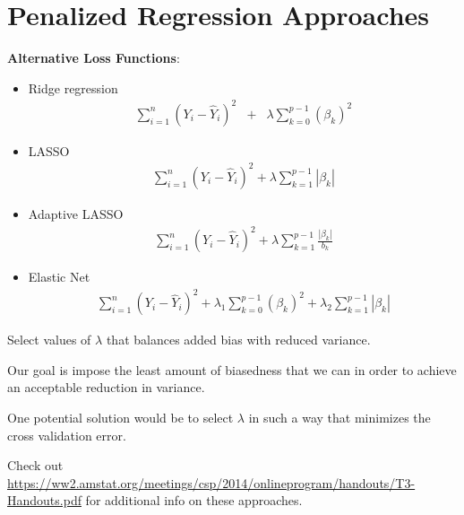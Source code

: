 \documentclass[12pt]{notes}
\begin{document}
\section{Penalized Regression Approaches}
\textbf{Alternative Loss Functions}:
\begin{itemize}
  \item Ridge regression
  \begin{eqnarray}
      \sum_{i=1}^{n} \left( Y_i - \hat{Y}_i \right)^2 & + & \lambda \sum_{k=0}^{p-1} \left(\beta_k \right)^2 \nonumber
  \end{eqnarray}
  \item LASSO
  \begin{eqnarray}
    \sum_{i=1}^{n} \left( Y_i - \hat{Y}_i \right)^2 + \lambda \sum_{k=1}^{p-1} |\beta_k| \nonumber
  \end{eqnarray}
  \item Adaptive LASSO
  \begin{eqnarray}
    \sum_{i=1}^{n} \left( Y_i - \hat{Y}_i \right)^2 + \lambda \sum_{k=1}^{p-1} \frac{|\beta_k|}{b_k} \nonumber
  \end{eqnarray}
   \item Elastic Net
  \begin{eqnarray}
    \sum_{i=1}^{n} \left( Y_i - \hat{Y}_i \right)^2 + \lambda_1 \sum_{k=0}^{p-1} \left(\beta_k \right)^2 + \lambda_2 \sum_{k=1}^{p-1} |\beta_k| \nonumber
  \end{eqnarray}
\end{itemize}

\nspace
\bi
\item Select values of $\lambda$ that balances added bias with reduced variance. 
\item Our goal is impose the least amount of biasedness that we can in order to achieve an acceptable reduction in variance. 
\item One potential solution would be to select $\lambda$ in such a way that minimizes the cross validation error. 
\ei

\nspace
Check out \url{https://ww2.amstat.org/meetings/csp/2014/onlineprogram/handouts/T3-Handouts.pdf} for additional info on these approaches. 


 \begin{minipage}[l][2cm][c]{\textwidth}
\end{minipage}
\end{document}
